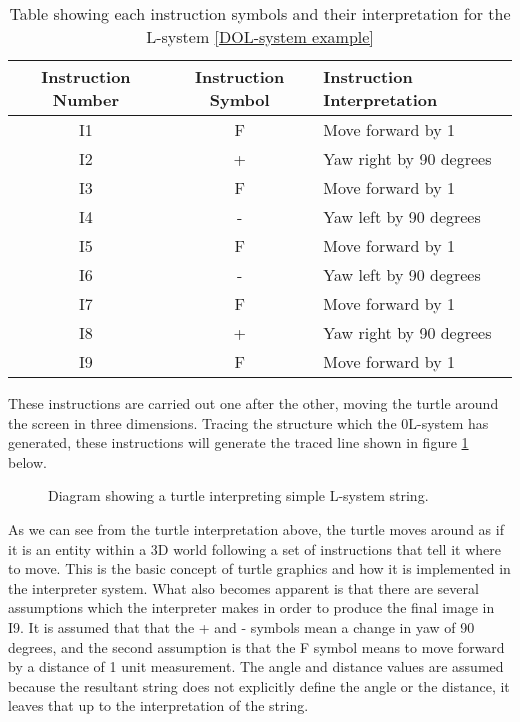 \begin{table}[h!]
\centering
\begin{tabular}{ | c | c | l | }
\hline
	 	Instruction Number & Instruction Symbol & Instruction Interpretation \\  
\hline
\hline
	I1 						& F & Move forward by 1\\
\hline
	I2						& + & Yaw right by 90 degrees\\
\hline
	I3						& F & Move forward by 1\\
\hline
	I4						& - & Yaw left by 90 degrees \\
\hline
	I5						& F & Move forward by 1\\
\hline
	I6 						& - & Yaw left by 90 degrees \\
\hline
	I7 						& F & Move forward by 1\\
\hline
	I8 						& + & Yaw right by 90 degrees\\
\hline
	I9 						& F & Move forward by 1\\
\hline
\end{tabular}
\caption{Table showing each instruction symbols and their interpretation for the L-system \ref{DOL-system example}}
\label{Instruction Interpretation}
\end{table}
\FloatBarrier

\noindent
These instructions are carried out one after the other, moving the turtle around the screen in three dimensions. Tracing the structure which the 0L-system has generated, these instructions will generate the traced line shown in figure \ref{basic turtle} below.

\begin{figure}[htbp]
	{\centering
		\setlength{\fboxrule}{1pt}
		\vspace{7px}
		\caption{Diagram showing a turtle interpreting simple L-system string.} \label{basic turtle}
	}
\end{figure}
\FloatBarrier

\noindent
As we can see from the turtle interpretation above, the turtle moves around as if it is an entity within a 3D world following a set of instructions that tell it where to move. This is the basic concept of turtle graphics and how it is implemented in the interpreter system. What also becomes apparent is that there are several assumptions which the interpreter makes in order to produce the final image in I9. It is assumed that that the + and - symbols mean a change in yaw of 90 degrees, and the second assumption is that the F symbol means to move forward by a distance of 1 unit measurement. The angle and distance values are assumed because the resultant string does not explicitly define the angle or the distance, it leaves that up to the interpretation of the string. 

